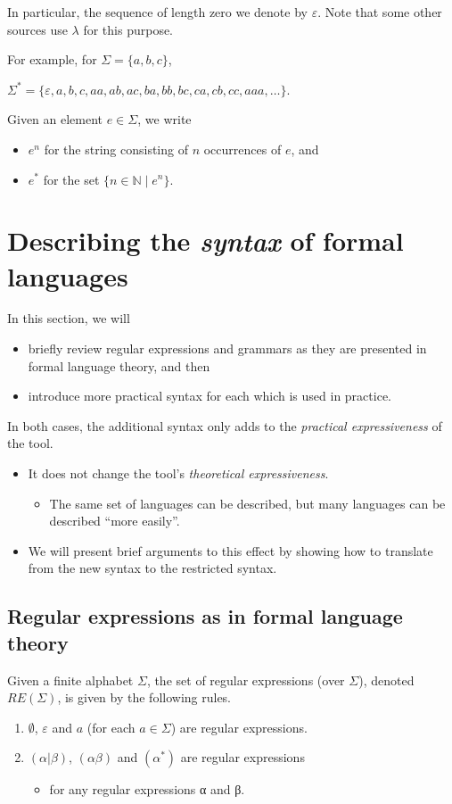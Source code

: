 \documentclass[11pt]{article}
\theoremstyle{definition}
\begin{document}
In particular, the sequence of length zero we denote by \(ε\).
Note that some other sources use \(λ\) for this purpose.

For example, for \(Σ = \{a, b, c\}\),
\begin{center}
\(Σ^{*} = \{ε, a, b, c, aa, ab, ac, ba, bb, bc, ca, cb, cc, aaa, …\}\).
\end{center}

Given an element \(e ∈ Σ\), we write
\begin{itemize}
\item \(e^{n}\) for the string consisting of \(n\) occurrences of \(e\), and
\item \(e^{*}\) for the set \(\{ n ∈ ℕ ∣ e^{n} \}\).
\end{itemize}

\section{Describing the \emph{syntax} of formal languages}
\label{sec:orgb460ce4}
In this section, we will
\begin{itemize}
\item briefly review regular expressions and grammars as
they are presented in formal language theory, and then
\item introduce more practical syntax for each
which is used in practice.
\end{itemize}

In both cases, the additional syntax only adds to
the \emph{practical expressiveness} of the tool.
\begin{itemize}
\item It does not change the tool's \emph{theoretical expressiveness}.
\begin{itemize}
\item The same set of languages can be described,
but many languages can be described “more easily”.
\end{itemize}
\item We will present brief arguments to this effect
by showing how to translate from the new syntax
to the restricted syntax.
\end{itemize}

\subsection{Regular expressions as in formal language theory}
\label{sec:org10e2747}
Given a finite alphabet \(Σ\),
the set of regular expressions (over \(Σ\)),
denoted \(RE(Σ)\), is given
by the following rules.
\begin{enumerate}
\item \(∅\), \(ε\) and \(a\) (for each \(a ∈ Σ\)) are regular expressions.
\item \((α | β)\), \((αβ)\) and \((α^{*})\) are regular expressions
\begin{itemize}
\item for any regular expressions α and β.
\end{itemize}
\end{enumerate}
\end{document}
